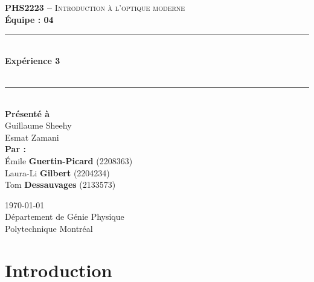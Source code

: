 \documentclass[11pt,letterpaper]{article}
\begin{document}
\begin{titlepage}
\center

\begin{figure}
\end{figure}
\vspace*{2 cm}

\textsc{\Large \textbf{PHS2223 --} Introduction à l'optique moderne}\\[0.5cm]
\large{\textbf{Équipe : 04}}\\[1.5cm]

\rule{\linewidth}{0.5mm} \\[0.5cm]
\Large{\textbf{Expérience 3}} \\[0.2cm]
\\
\rule{\linewidth}{0.2mm} \\[2.3cm]

\large{\textbf{Présenté à}\\
  Guillaume Sheehy\\
  Esmat Zamani\\[2.5cm]
  \textbf{Par :}\\
  Émile \textbf{Guertin-Picard} (2208363)\\
  Laura-Li \textbf{Gilbert} (2204234)\\
  Tom \textbf{Dessauvages} (2133573)\\[3cm]}

\large{\today\\
Département de Génie Physique\\
Polytechnique Montréal\\}

\end{titlepage}


\tableofcontents
{}
\newpage

\pagestyle{fancy}
\setlength{\headheight}{14pt}
\renewcommand{\headrulewidth}{0pt}
\fancyfoot[R]{\thepage}

\pagestyle{fancy}
\fancyhf{}
\renewcommand{\headrulewidth}{1pt}
\fancyhead[R]{\today}
\fancyfoot[R]{\thepage}

\setcounter{page}{1}


\section{Introduction}
\end{document}
